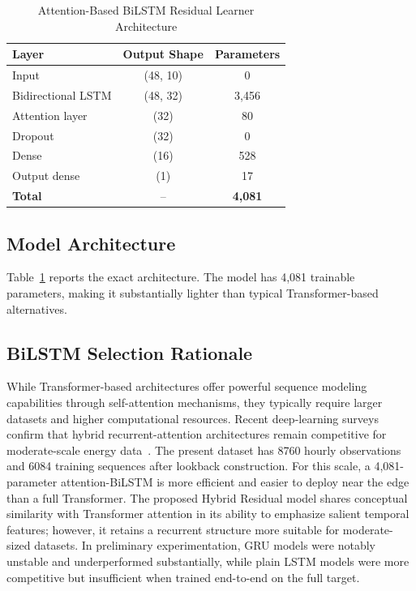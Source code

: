 \documentclass{ieeeaccess}
\begin{document}
\begin{table}[!t]
\caption{Attention-Based BiLSTM Residual Learner Architecture}
\label{tab:architecture}
\centering
\begin{tabular}{lcc}
\toprule
Layer & Output Shape & Parameters \\
\midrule
Input & (48, 10) & 0 \\
Bidirectional LSTM & (48, 32) & 3,456 \\
Attention layer & (32) & 80 \\
Dropout & (32) & 0 \\
Dense & (16) & 528 \\
Output dense & (1) & 17 \\
\midrule
\textbf{Total} & -- & \textbf{4,081} \\
\bottomrule
\end{tabular}
\end{table}

\subsection{Model Architecture}
Table~\ref{tab:architecture} reports the exact architecture. The model has 4,081 trainable parameters, making it substantially lighter than typical Transformer-based alternatives.

\subsection{BiLSTM Selection Rationale}
While Transformer-based architectures offer powerful sequence modeling capabilities through self-attention mechanisms, they typically require larger datasets and higher computational resources. Recent deep-learning surveys confirm that hybrid recurrent-attention architectures remain competitive for moderate-scale energy data~\cite{dl_timeseries_access,lee_solar_access,abdel_nabi_access}. The present dataset has 8760 hourly observations and 6084 training sequences after lookback construction. For this scale, a 4,081-parameter attention-BiLSTM is more efficient and easier to deploy near the edge than a full Transformer. The proposed Hybrid Residual model shares conceptual similarity with Transformer attention in its ability to emphasize salient temporal features; however, it retains a recurrent structure more suitable for moderate-sized datasets. In preliminary experimentation, GRU models were notably unstable and underperformed substantially, while plain LSTM models were more competitive but insufficient when trained end-to-end on the full target.
\end{document}
